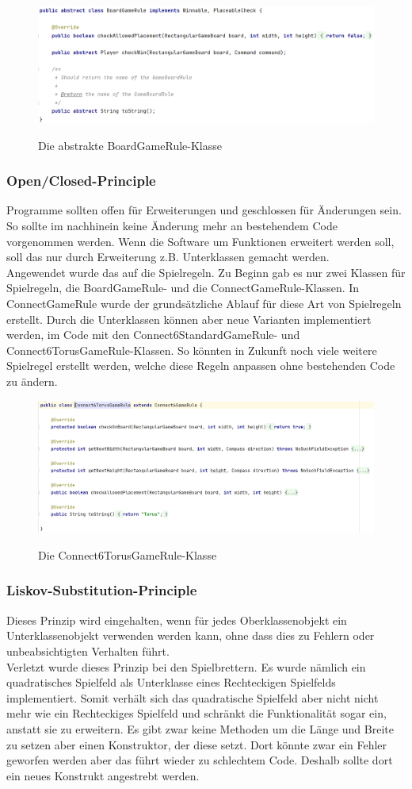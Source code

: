 \documentclass[12pt]{article}
\newcommand{\boardGR}{\includegraphics[width=15cm]{Bilder/BoardGameRule}}
\newcommand{\torus}{\includegraphics[width=15cm]{Bilder/Torus}}
\begin{document}
\begin{figure}[H]
\centering
{\boardGR}
\caption{Die abstrakte BoardGameRule-Klasse}
\label{fig:boardGR}
\end{figure}



\subsubsection{Open/Closed-Principle}
Programme sollten offen für Erweiterungen und geschlossen für Änderungen sein. So sollte im nachhinein keine Änderung mehr an bestehendem Code vorgenommen werden. Wenn die Software um Funktionen erweitert werden soll, soll das nur durch Erweiterung z.B. Unterklassen gemacht werden.
\\

Angewendet wurde das auf die Spielregeln. Zu Beginn gab es nur zwei Klassen für Spielregeln, die BoardGameRule- und die ConnectGameRule-Klassen. In ConnectGameRule wurde der grundsätzliche Ablauf für diese Art von Spielregeln erstellt. Durch die Unterklassen können aber neue Varianten implementiert werden, im Code mit den Connect6StandardGameRule- und Connect6TorusGameRule-Klassen. So könnten in Zukunft noch viele weitere Spielregel erstellt werden, welche diese Regeln anpassen ohne bestehenden Code zu ändern.

\begin{figure}[H]
\centering
{\torus}
\caption{Die Connect6TorusGameRule-Klasse}
\label{fig:torus}
\end{figure}



\subsubsection{Liskov-Substitution-Principle}
Dieses Prinzip wird eingehalten, wenn für jedes Oberklassenobjekt ein Unterklassenobjekt verwenden werden kann, ohne dass dies zu Fehlern oder unbeabsichtigten Verhalten führt. 
\\

Verletzt wurde dieses Prinzip bei den Spielbrettern. Es wurde nämlich ein quadratisches Spielfeld als Unterklasse eines Rechteckigen Spielfelds implementiert. Somit verhält sich das quadratische Spielfeld aber nicht nicht mehr wie ein Rechteckiges Spielfeld und schränkt die Funktionalität sogar ein, anstatt sie zu erweitern.
Es gibt zwar keine Methoden um die Länge und Breite zu setzen aber einen Konstruktor, der diese setzt. Dort könnte zwar ein Fehler geworfen werden aber das führt wieder zu \glqq schlechtem \grqq Code. Deshalb sollte dort ein neues Konstrukt angestrebt werden.
\end{document}

